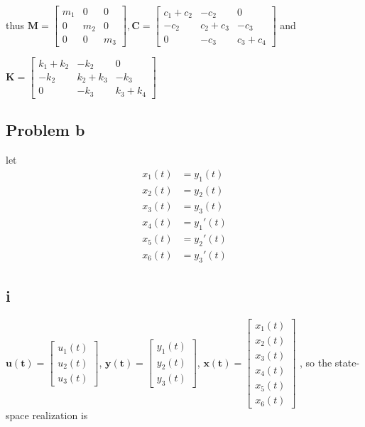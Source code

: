 \documentclass[12pt,a4paper]{article}
\begin{document}
thus 
$\mathbf{M} = \begin{bmatrix}
    m_1 & 0   & 0   \\
    0   & m_2 & 0   \\
    0   & 0   & m_3
\end{bmatrix},
\mathbf{\mathbf{C}} = \begin{bmatrix}
    c_1+c_2         & -c_2             & 0              \\
    -c_2            & c_2+c_3         & -c_3       \\
    0               & -c_3           & c_3+c_4
\end{bmatrix}$
and

$
\mathbf{K} = \begin{bmatrix}
    k_1+k_2         & -k_2             & 0              \\
    -k_2            & k_2+k_3         & -k_3       \\
    0               & -k_3           & k_3+k_4
\end{bmatrix}
$

\subsection*{Problem b}
let
\[
    \begin{aligned}
        x_1(t) &= y_1(t) \\
        x_2(t) &= y_2(t) \\
        x_3(t) &= y_3(t) \\
        x_4(t) &= y_1'(t) \\
        x_5(t) &= y_2'(t) \\
        x_6(t) &= y_3'(t)
    \end{aligned}
\]
\subsection*{i}

$\mathbf{u(t)} = \begin{bmatrix}
    u_1(t)\\
    u_2(t) \\
    u_3(t)
\end{bmatrix}
$, $\mathbf{y(t)} = \begin{bmatrix}
    y_1(t)\\
    y_2(t)\\
    y_3(t)
\end{bmatrix}
$, $\mathbf{x(t)} = \begin{bmatrix}
    x_1(t)\\
    x_2(t)\\
    x_3(t)\\
    x_4(t)\\
    x_5(t)\\
    x_6(t)
\end{bmatrix}
$
, so the state-space realization is
\end{document}
